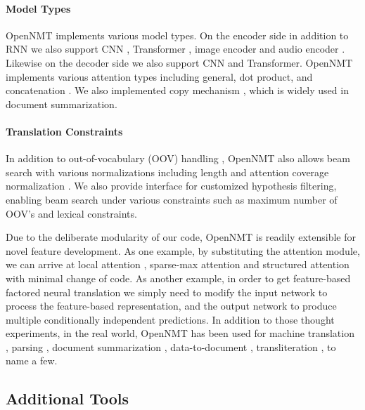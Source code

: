 \documentclass[]{article}
\begin{document}
\paragraph{Model Types} OpenNMT implements various model types. On the encoder side in addition to RNN we also support CNN \citep{gehring2017convolutional}, Transformer \citep{vaswani2017attention}, image encoder \citep{DBLP:conf/conll/BowmanVVDJB16,DBLP:journals/corr/DengKR16} and audio encoder \citep{DBLP:journals/corr/ChanJLV15}. Likewise on the decoder side we also support CNN and Transformer. OpenNMT implements various attention types including general, dot product, and concatenation \citep{luong2015effective,britz2017massive}.
We also implemented copy mechanism \citep{vinyals2015pointer,gu2016incorporating}, which is widely used in document summarization.
\paragraph{Translation Constraints} In addition to out-of-vocabulary (OOV) handling \citep{Luong2015b}, OpenNMT also allows beam search with various normalizations including length and attention coverage normalization \citep{wu2016google}. We also provide interface for customized hypothesis filtering, enabling beam search under various constraints such as maximum number of OOV's and lexical constraints.


Due to the deliberate modularity of our code, OpenNMT is readily extensible for novel feature development. As one example, by substituting the attention module, we can arrive at local attention \citep{Luong2015}, sparse-max attention
\citep{martins2016softmax} and structured attention \citep{kim2017structured} with minimal change of code. As another example, in order to get feature-based factored neural translation \citep{sennrich2016linguistic} we simply need to modify the input network to process the feature-based representation, and the output network to produce multiple conditionally independent predictions. In addition to those thought experiments, in the real world, OpenNMT has been used for machine translation \citep{levin2017toward,ha2017effective,sharaf2017umd,sekizawa2017improving,ma2017osu}, parsing \citep{van2017neural}, document summarization \citep{ling2017coarse}, data-to-document \citep{wiseman2017challenges,gardent2017webnlg}, transliteration \citep{ameur2017arabic}, to name a few.


\subsection{Additional Tools}
\end{document}
